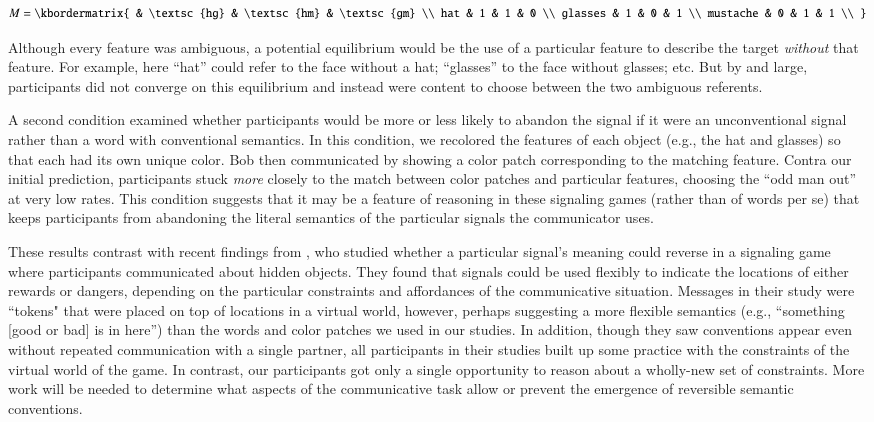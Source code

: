 \documentclass[man,noapacite]{apa2}
\begin{document}
\begin{equation}
    M = \kbordermatrix{
               & \textsc{hg} & \textsc{hm} & \textsc{gm} \\
      hat      & 1  & 1  & 0  \\
      glasses  & 1  & 0  & 1 \\
      mustache & 0  & 1  & 1 \\
    }
\end{equation}

\noindent Although every feature was ambiguous, a potential equilibrium would be the use of a particular feature to describe the target \emph{without} that feature. For example, here ``hat'' could refer to the face without a hat; ``glasses'' to the face without glasses; etc. But by and large, participants did not converge on this equilibrium and instead were content to choose between the two ambiguous referents.

A second condition examined whether participants would be more or less likely to abandon the signal if it were an unconventional signal rather than a word with conventional semantics. In this condition, we recolored the features of each object (e.g., the hat and glasses) so that each had its own unique color. Bob then communicated by showing a color patch corresponding to the matching feature. Contra our initial prediction, participants stuck \emph{more} closely to the match between color patches and particular features, choosing the ``odd man out'' at very low rates. This condition suggests that it may be a feature of reasoning in these signaling games (rather than of words per se) that keeps participants from abandoning the literal semantics of the particular signals the communicator uses.

These results contrast with recent findings from , who studied whether a particular signal's meaning could reverse in a signaling game where participants communicated about hidden objects. They found that signals could be used flexibly to indicate the locations of either rewards or dangers, depending on the particular constraints and affordances of the communicative situation. Messages in their study were ``tokens" that were placed on top of locations in a virtual world, however, perhaps suggesting a more flexible semantics (e.g., ``something [good or bad] is in here'') than the words and color patches we used in our studies. In addition, though they saw conventions appear even without repeated communication with a single partner, all participants in their studies built up some practice with the constraints of the virtual world of the game. In contrast, our participants got only a single opportunity to reason about a wholly-new set of constraints. More work will be needed to determine what aspects of the communicative task allow or prevent the emergence of reversible semantic conventions.
\end{document}
